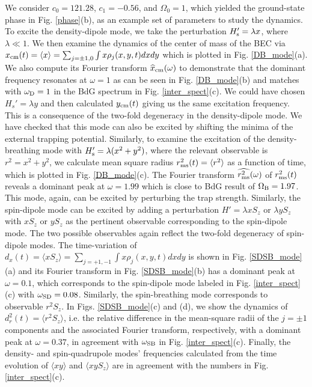 \documentclass[pra,twocolumn,aps,superscriptaddress,showpacs,longbibliography]{revtex4-1}
\begin{document}
We consider $c_0 = 121.28$, $c_1 = -0.56$, and $\Omega_0 = 1$, 
which yielded the ground-state phase in Fig. \ref{phase}(b), as an example set of parameters to study the dynamics.
To excite the density-dipole mode, we take the perturbation $H_{\rm s}' = \lambda x$, where $\lambda\ll 1$. 
We then examine the dynamics of the center of mass of the BEC via $x_{\rm cm}(t) = \langle x \rangle = 
\sum_{j=\pm 1,0}\int x \rho_j(x,y,t) dxdy$ which is plotted in Fig. \ref{DB_mode}(a). 
We also compute its Fourier transform $\widehat{x}_{\rm cm}(\omega)$  to demonstrate that the dominant 
frequency resonates at $\omega=1$ as can be seen in Fig. \ref{DB_mode}(b) and matches
with $\omega_{\rm D} = 1$ in the BdG spectrum in Fig. \ref{inter_spect}(c). We could have
chosen $H_s' = \lambda y$ and then calculated $y_{\rm cm}(t)$ giving us the same excitation frequency.
This is a consequence of the two-fold degeneracy in the density-dipole mode.
We have checked that this mode can also be excited by shifting the minima of the external trapping potential. 
Similarly, to examine the excitation of the density-breathing mode with $H_{\rm s}' = \lambda (x^2+y^2)$, where 
the relevant observable is $r^2 = x^2+y^2$, we calculate mean square radius $r_{\rm ms}^2(t) = \langle r^2\rangle$ 
as a function of time, which is plotted in Fig. \ref{DB_mode}(c). 
The Fourier transform $\widehat{r_{\rm ms}^2}(\omega)$ of $r_{\rm ms}^2(t)$ reveals a dominant peak at 
$\omega=1.99$ which is close to BdG result of $\Omega_{\rm B} = 1.97$. This mode, again, can be excited by perturbing the trap strength. 
Similarly, the spin-dipole mode can be excited by adding a perturbation $H' = \lambda x S_z$ or $\lambda y S_z$  
with $x S_{z}$ or $y S_{z}$ as the pertinent observable  corresponding to the spin-dipole mode. The
two possible observables again reflect the two-fold degeneracy of spin-dipole modes.
The time-variation of $d_x(t)= \langle x S_z\rangle = 
\sum_{j= +1,-1} \int x \rho_j(x,y,t) dx dy$
is shown in Fig. \ref{SDSB_mode}(a) and its Fourier transform in Fig. \ref{SDSB_mode}(b) 
has a dominant  peak 
at $\omega=0.1$, which corresponds to the spin-dipole mode labeled in 
Fig. \ref{inter_spect}(c) with $\omega_{\rm SD} = 0.08$. 
Similarly, the spin-breathing mode corresponds to observable $r^2 S_{z}$. 
In Figs. \ref{SDSB_mode}(c) and (d), we show the dynamics of $d_r^2(t) = \langle r^2S_z\rangle$,
i.e. the relative difference in the mean-square radii of the $j = \pm 1$ components and the 
associated Fourier transform, respectively, with a dominant peak at $\omega=0.37$, in agreement with $\omega_{\rm SB}$ 
in Fig. \ref{inter_spect}(c). Finally, the density- and spin-quadrupole modes' frequencies
calculated from the time evolution of $\langle x y\rangle$ and $\langle x y S_{z}\rangle$ are
in agreement with the numbers in Fig. \ref{inter_spect}(c).
\end{document}
